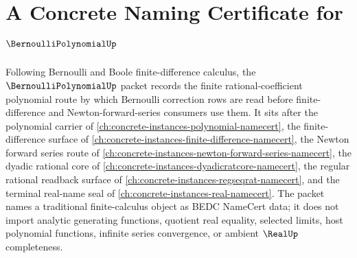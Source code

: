 \chapter{A Concrete Naming Certificate for $\BernoulliPolynomialUp$}
\label{ch:concrete-instances-bernoulli-polynomial-namecert}

Following Bernoulli and Boole finite-difference calculus, the $\BernoulliPolynomialUp$ packet records the finite rational-coefficient polynomial route by which Bernoulli correction rows are read before finite-difference and Newton-forward-series consumers use them. It sits after the polynomial carrier of \autoref{ch:concrete-instances-polynomial-namecert}, the finite-difference surface of \autoref{ch:concrete-instances-finite-difference-namecert}, the Newton forward series route of \autoref{ch:concrete-instances-newton-forward-series-namecert}, the dyadic rational core of \autoref{ch:concrete-instances-dyadicratcore-namecert}, the regular rational readback surface of \autoref{ch:concrete-instances-regseqrat-namecert}, and the terminal real-name seal of \autoref{ch:concrete-instances-real-namecert}. The packet names a traditional finite-calculus object as BEDC NameCert data; it does not import analytic generating functions, quotient real equality, selected limits, host polynomial functions, infinite series convergence, or ambient $\RealUp$ completeness.

